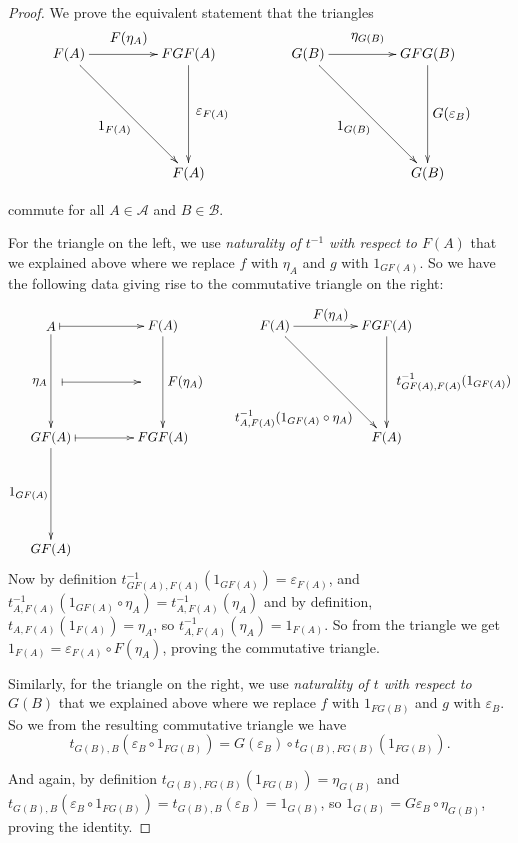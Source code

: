 \documentclass[11pt]{article}
\theoremstyle{definition}
\theoremstyle{definition}
\theoremstyle{plain}
\theoremstyle{plain}
\theoremstyle{plain}
\begin{document}
\begin{proof}
We prove the equivalent statement that the triangles
\begin{equation*}
\begin{xy}
(0,0)*+{F(A)}="f1"; (30,0)*+{FGF(A)}="fgf"; (30,-30)*+{F(A)}="f2";
(60,0)*+{G(B)}="g1"; (90,0)*+{GFG(B)}="gfg"; (90, -30)*+{G(B)}="g2";
{\ar "f1";"fgf"}?*!/_4mm/{F(\eta_{A})}; {\ar "fgf";"f2"}?*!/_6mm/{\varepsilon_{F(A)}}; {\ar "f1";"f2"}?*!/^5mm/{1_{F(A)}};
{\ar "g1";"gfg"}?*!/_4mm/{\eta_{G(B)}}; {\ar "gfg";"g2"}?*!/_6mm/{G(\varepsilon_{B})}; {\ar "g1";"g2"}?*!/^5mm/{1_{G(B)}};
\end{xy}
\end{equation*}

commute for all $A \in \mathscr{A}$ and $B \in \mathscr{B}$.

For the triangle on the left, we use \emph{naturality of $t^{-1}$ with respect to $F(A)$} that we explained above where we replace $f$ with $\eta_{A}$ and $g$ with $1_{GF(A)}$. So we have the following data giving rise to the commutative triangle on the right:

\begin{equation*}
\begin{xy}
(0,0)*+{A}="a"; (30, 0)*+{F(A)}="fa"; (0, -30)*+{GF(A)}="gfa1"; (30, -30)*+{FGF(A)}="fgfa"; (00, -60)*+{GF(A)}="gfa2";
(60,0)*+{F(A)}="fat1"; (90, 0)*+{FGF(A)}="fgfat"; (90, -30)*+{F(A)}="fat2";
{\ar "a";"gfa1"}?*!/^3mm/{\eta_{A}}; {\ar "fa";"fgfa"}?*!/_6mm/{F(\eta_{A})}; {\ar "gfa1";"gfa2"}?*!/^6mm/{1_{GF(A)}};
{\ar@{|->} "a";"fa"}; {\ar@{|->} (3,-15);(24, -15)}; {\ar@{|->} "gfa1";"fgfa"};
{\ar "fat1";"fgfat"}?*!/_3mm/{F(\eta_{A})};
{\ar "fgfat";"fat2"}?*!/_18mm/{t^{-1}_{GF(A),F(A)}(1_{GF(A)})};
{\ar "fat1";"fat2"}?*!/^14mm/{t^{-1}_{A,F(A)}(1_{GF(A)} \circ \eta_{A})}
\end{xy}
\end{equation*}
Now by definition $t^{-1}_{GF(A),F(A)}(1_{GF(A)})=\varepsilon_{F(A)}$, and $t^{-1}_{A,F(A)}(1_{GF(A)} \circ \eta_{A})=t^{-1}_{A,F(A)}(\eta_{A})$ and by definition, $t_{A,F(A)}(1_{F(A)}) = \eta_{A}$, so $t^{-1}_{A,F(A)}(\eta_{A})=1_{F(A)}$. So from the triangle we get $1_{F(A)} = \varepsilon_{F(A)} \circ F(\eta_{A})$, proving the commutative triangle.

Similarly, for the triangle on the right, we use \emph{naturality of $t$ with respect to $G(B)$} that we explained above where we replace $f$ with $1_{FG(B)}$ and $g$ with $\varepsilon_{B}$. So we from the resulting commutative triangle we have
\begin{equation*}
t_{G(B),B}(\varepsilon_{B} \circ 1_{FG(B)}) = G(\varepsilon_{B}) \circ t_{G(B),FG(B)}(1_{FG(B)}).
\end{equation*}

And again, by definition $t_{G(B),FG(B)}(1_{FG(B)})=\eta_{G(B)}$ and $t_{G(B),B}(\varepsilon_{B} \circ 1_{FG(B)})=t_{G(B),B}(\varepsilon_{B})=1_{G(B)}$, so $1_{G(B)}=G\varepsilon_{B} \circ \eta_{G(B)}$, proving the identity.

\end{proof}
\end{document}
